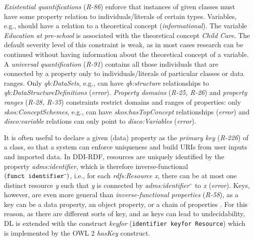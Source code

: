 \documentclass[conference]{IEEEtran}
\newcommand{\ms}[1]{\texttt{#1}}
\newenvironment{DL}{
  \small
  \vspace{0cm}
	\begin{center}
  \begin{tabular}{c l}

}{
  \end{tabular}
	\end{center}
}
\begin{document}
\emph{Existential quantifications} (\emph{R-86}) enforce that instances of given classes must have some property relation to individuals/literals of certain types.
Variables, e.g., should have a relation to a theoretical concept (\emph{informational}).
The variable \emph{Education at pre-school} is associated with the theoretical concept \emph{Child Care}. 
The default severity level of this constraint is weak, as in most cases research can be continued without having information about the theoretical concept of a variable.
%
A \emph{universal quantification} (\emph{R-91}) contains all those individuals that are connected by a property only to individuals/literals of particular classes  or data ranges.
Only \emph{qb:DataSets}, e.g., can have \emph{qb:structure} relationships to \emph{qb:DataStructureDefinitions} (\emph{error}).
\emph{Property domains} (\emph{R-25, R-26}) and \emph{property ranges} (\emph{R-28, R-35}) constraints restrict domains and ranges of properties:
only \emph{skos:ConceptSchemes}, e.g., can have \emph{skos:hasTopConcept} relationships (\emph{error}) and \emph{disco:variable} relations can only point to \emph{disco:Variables} (\emph{error}).

It is often useful to declare a given (data) property as the \emph{primary key} (\emph{R-226}) of a class, so that a system can enforce uniqueness and build URIs from user inputs and imported data. 
In DDI-RDF, resources are uniquely identified by the property \emph{adms:identifier},
which is therefore inverse-functional $({\small\ms{funct identifier}\sp{\overline{\ }}})$,
i.e., for each \emph{rdfs:Resource x}, there can be at most one distinct resource \emph{y} such that \emph{y} is connected by \emph{adms:identifier$\sp{\overline{\ }}$} to \emph{x} (\emph{error}).
Keys, however, are even more general than \emph{inverse-functional properties} (\emph{R-58}),
as a key can be a data property, an object property, or a chain of properties \cite{Schneider2009}.
For this reason, as there are different sorts of key, and as keys can lead to undecidability, 
DL is extended with the construct \emph{keyfor} ({\small\ms{identifier \ms{keyfor} Resource}}) \cite{Lutz2005} which is implemented by the OWL 2 \emph{hasKey} construct.
\end{document}
